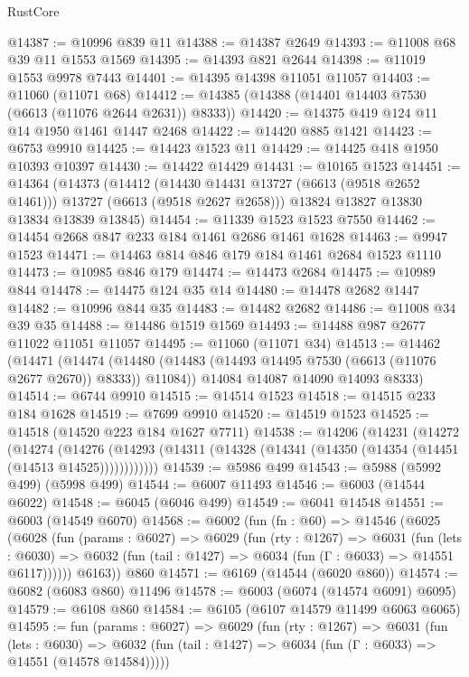 \begin{lexlean}{RustCore}
\begin{coremodule}
@14387 := @10996 @839 @11
@14388 := @14387 @2649
@14393 := @11008 @68 @39 @11 @1553 @1569
@14395 := @14393 @821 @2644
@14398 := @11019 @1553 @9978 @7443
@14401 := @14395 @14398 @11051 @11057
@14403 := @11060 (@11071 @68)
@14412 := @14385 (@14388 (@14401 @14403 @7530 (@6613 (@11076 @2644 @2631)) @8333))
@14420 := @14375 @419 @124 @11 @14 @1950 @1461 @1447 @2468
@14422 := @14420 @885 @1421
@14423 := @6753 @9910
@14425 := @14423 @1523 @11
@14429 := @14425 @418 @1950 @10393 @10397
@14430 := @14422 @14429
@14431 := @10165 @1523
@14451 := @14364
    (@14373
      (@14412 (@14430 @14431 @13727 (@6613 (@9518 @2652 @1461))) @13727 (@6613 (@9518 @2627 @2658)))
      @13824
      @13827
      @13830
      @13834
      @13839
      @13845)
@14454 := @11339 @1523 @1523 @7550
@14462 := @14454 @2668 @847 @233 @184 @1461 @2686 @1461 @1628
@14463 := @9947 @1523
@14471 := @14463 @814 @846 @179 @184 @1461 @2684 @1523 @1110
@14473 := @10985 @846 @179
@14474 := @14473 @2684
@14475 := @10989 @844
@14478 := @14475 @124 @35 @14
@14480 := @14478 @2682 @1447
@14482 := @10996 @844 @35
@14483 := @14482 @2682
@14486 := @11008 @34 @39 @35
@14488 := @14486 @1519 @1569
@14493 := @14488 @987 @2677 @11022 @11051 @11057
@14495 := @11060 (@11071 @34)
@14513 := @14462
    (@14471
      (@14474 (@14480 (@14483 (@14493 @14495 @7530 (@6613 (@11076 @2677 @2670)) @8333)) @11084))
      @14084
      @14087
      @14090
      @14093
      @8333)
@14514 := @6744 @9910
@14515 := @14514 @1523
@14518 := @14515 @233 @184 @1628
@14519 := @7699 @9910
@14520 := @14519 @1523
@14525 := @14518 (@14520 @223 @184 @1627 @7711)
@14538 := @14206
    (@14231
      (@14272
        (@14274
          (@14276 (@14293 (@14311 (@14328 (@14341 (@14350 (@14354 (@14451 (@14513 @14525))))))))))))
@14539 := @5986 @499
@14543 := @5988 (@5992 @499) (@5998 @499)
@14544 := @6007 @11493
@14546 := @6003 (@14544 @6022)
@14548 := @6045 (@6046 @499)
@14549 := @6041 @14548
@14551 := @6003 (@14549 @6070)
@14568 := @6002
    (fun (fn : @60) =>
    @14546
      (@6025
        (@6028
          (fun (params : @6027) =>
          @6029
            (fun (rty : @1267) =>
            @6031
              (fun (lets : @6030) =>
              @6032 (fun (tail : @1427) => @6034 (fun (Γ : @6033) => @14551 @6117))))))
        @6163))
    @860
@14571 := @6169 (@14544 (@6020 @860))
@14574 := @6082 (@6083 @860) @11496
@14578 := @6003 (@6074 (@14574 @6091) @6095)
@14579 := @6108 @860
@14584 := @6105 (@6107 @14579 @11499 @6063 @6065)
@14595 := fun (params : @6027) =>
  @6029
    (fun (rty : @1267) =>
    @6031
      (fun (lets : @6030) =>
      @6032 (fun (tail : @1427) => @6034 (fun (Γ : @6033) => @14551 (@14578 @14584)))))

\end{coremodule}
\end{lexlean}
